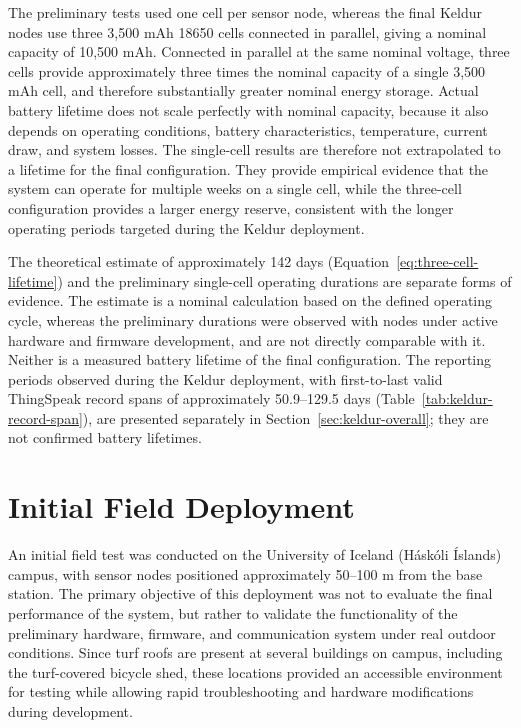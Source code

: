 The preliminary tests used one cell per sensor node, whereas the final Keldur nodes use three 3,500 mAh 18650 cells connected in parallel, giving a nominal capacity of 10,500 mAh. Connected in parallel at the same nominal voltage, three cells provide approximately three times the nominal capacity of a single 3,500 mAh cell, and therefore substantially greater nominal energy storage. Actual battery lifetime does not scale perfectly with nominal capacity, because it also depends on operating conditions, battery characteristics, temperature, current draw, and system losses. The single-cell results are therefore not extrapolated to a lifetime for the final configuration. They provide empirical evidence that the system can operate for multiple weeks on a single cell, while the three-cell configuration provides a larger energy reserve, consistent with the longer operating periods targeted during the Keldur deployment.

The theoretical estimate of approximately 142 days (Equation~\ref{eq:three-cell-lifetime}) and the preliminary single-cell operating durations are separate forms of evidence. The estimate is a nominal calculation based on the defined operating cycle, whereas the preliminary durations were observed with nodes under active hardware and firmware development, and are not directly comparable with it. Neither is a measured battery lifetime of the final configuration. The reporting periods observed during the Keldur deployment, with first-to-last valid ThingSpeak record spans of approximately 50.9--129.5 days (Table~\ref{tab:keldur-record-span}), are presented separately in Section~\ref{sec:keldur-overall}; they are not confirmed battery lifetimes.

\section{Initial Field
Deployment}

An initial field test was conducted on the University of Iceland (Háskóli Íslands) campus, with sensor nodes positioned approximately 50--100 m from the base station. The primary objective of
this deployment was not to evaluate the final performance of the system,
but rather to validate the functionality of the preliminary hardware,
firmware, and communication system under real outdoor conditions. Since
turf roofs are present at several buildings on campus, including the
turf-covered bicycle shed, these locations provided an accessible
environment for testing while allowing rapid troubleshooting and
hardware modifications during development.

